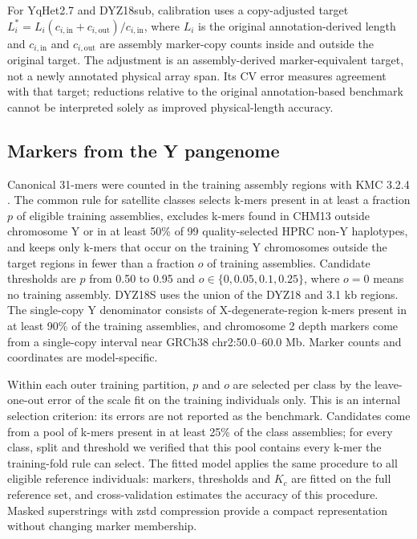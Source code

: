 \documentclass[pdflatex,sn-nature]{sn-jnl}
\begin{document}
For YqHet2.7 and DYZ18sub, calibration uses a copy-adjusted target $L_i^*=L_i(c_{i,\mathrm{in}}+c_{i,\mathrm{out}})/c_{i,\mathrm{in}}$, where $L_i$ is the original annotation-derived length and $c_{i,\mathrm{in}}$ and $c_{i,\mathrm{out}}$ are assembly marker-copy counts inside and outside the original target. The adjustment is an assembly-derived marker-equivalent target, not a newly annotated physical array span. Its CV error measures agreement with that target; reductions relative to the original annotation-based benchmark cannot be interpreted solely as improved physical-length accuracy.

\subsection{Markers from the Y pangenome}\label{sec:m-markers}
Canonical 31-mers were counted in the training assembly regions with KMC 3.2.4 \cite{Kokot2017}. The common rule for satellite classes selects k-mers present in at least a fraction $p$ of eligible training assemblies, excludes k-mers found in CHM13 outside chromosome Y \cite{Nurk2022} or in at least 50\% of 99 quality-selected HPRC non-Y haplotypes, and keeps only k-mers that occur on the training Y chromosomes outside the target regions in fewer than a fraction $o$ of training assemblies. Candidate thresholds are $p$ from 0.50 to 0.95 and $o\in\{0,0.05,0.1,0.25\}$, where $o=0$ means no training assembly. DYZ18S uses the union of the DYZ18 and 3.1 kb regions. The single-copy Y denominator consists of X-degenerate-region k-mers present in at least 90\% of the training assemblies, and chromosome 2 depth markers come from a single-copy interval near GRCh38 chr2:50.0--60.0 Mb. Marker counts and coordinates are model-specific.

Within each outer training partition, $p$ and $o$ are selected per class by the leave-one-out error of the scale fit on the training individuals only. This is an internal selection criterion: its errors are not reported as the benchmark. Candidates come from a pool of k-mers present in at least 25\% of the class assemblies; for every class, split and threshold we verified that this pool contains every k-mer the training-fold rule can select. The fitted model applies the same procedure to all eligible reference individuals: markers, thresholds and $K_c$ are fitted on the full reference set, and cross-validation estimates the accuracy of this procedure. Masked superstrings \cite{Sladky2023} with zstd compression provide a compact representation without changing marker membership.
\end{document}
